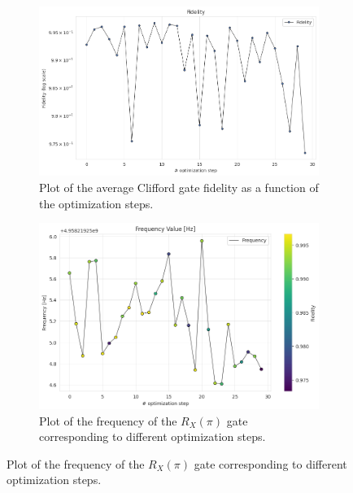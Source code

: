 \begin{figure}[h]
    \centering
    \begin{subfigure}[t]{0.45\textwidth}
        \includegraphics[width=\textwidth]{figures/png/RB_optimization/CMA/fidelity.png}
        \caption{Plot of the average Clifford gate fidelity as a function of the optimization steps.}
        \label{fig:CMA:fidelity}
    \end{subfigure}
    \hfill
    \begin{subfigure}[t]{0.45\textwidth}
        \includegraphics[width=\textwidth]{figures/png/RB_optimization/CMA/CMA_frequency.png}
        \caption{Plot of the frequency of the $R_X(\pi)$ gate corresponding to different optimization steps.}
        \label{fig:CMA:frequency}
    \end{subfigure}

    \vspace{0.5cm}


\end{figure}
